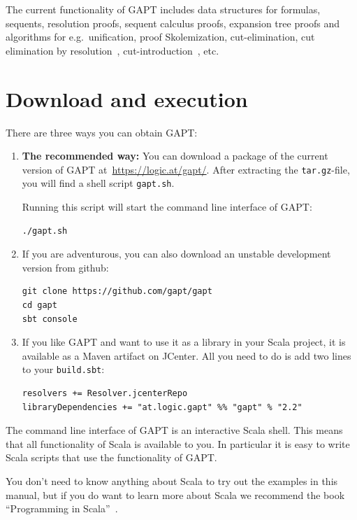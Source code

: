 \documentclass[a4paper,11pt]{article}
\begin{document}
The current functionality of GAPT includes data structures for formulas,
sequents, resolution proofs, sequent calculus proofs, expansion tree proofs and
algorithms for e.g.\ unification, proof Skolemization, cut-elimination, cut
elimination by resolution~\cite{Baaz00CutElimination},
cut-introduction~\cite{Hetzl2012}, etc.

\section{Download and execution}

There are three ways you can obtain GAPT:

\begin{enumerate}

\item {\bfseries The recommended way:}  You can download a package of the current
version of GAPT at~\url{https://logic.at/gapt/}.  After extracting
the \texttt{tar.gz}-file, you will find a shell script \texttt{gapt.sh}.

Running this script will start the command line interface of GAPT:
\begin{lstlisting}
./gapt.sh
\end{lstlisting}

\item If you are adventurous, you can also download an unstable development
  version from github:
\begin{lstlisting}
git clone https://github.com/gapt/gapt
cd gapt
sbt console
\end{lstlisting}

\item If you like GAPT and want to use it as a library in your Scala project,
  it is available as a Maven artifact on JCenter.  All you need to do is add
  two lines to your \verb,build.sbt,:
\begin{lstlisting}
resolvers += Resolver.jcenterRepo
libraryDependencies += "at.logic.gapt" %% "gapt" % "2.2"
\end{lstlisting}

\end{enumerate}

The command line interface of GAPT is an interactive Scala shell.  This means
that all functionality of Scala is available to you.  In particular it is easy
to write Scala scripts that use the functionality of GAPT.

You don't need to know anything about Scala to try out the examples in this
manual, but if you do want to learn more about Scala we recommend the book
``Programming in Scala''~\cite{odersky2008programming}.
\end{document}
